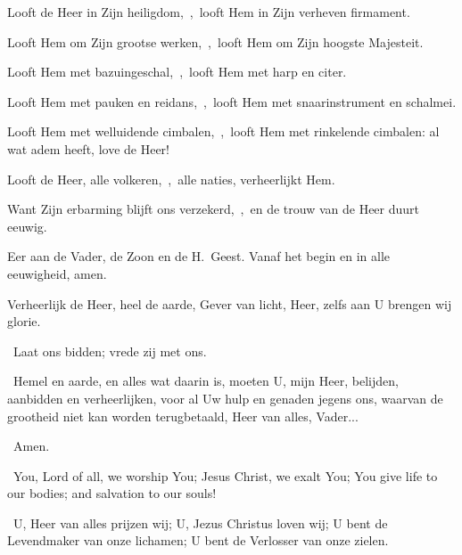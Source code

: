 \documentclass[12pt,twoside,a5paper]{article}
\begin{document}
\begin{halfparskip}
   Looft de Heer in Zijn heiligdom,~\sep\ looft Hem in Zijn verheven firmament.

  Looft Hem om Zijn grootse werken,~\sep\ looft Hem om Zijn hoogste Majesteit.

  Looft Hem met bazuingeschal,~\sep\ looft Hem met harp en citer.

  Looft Hem met pauken en reidans,~\sep\ looft Hem met snaarinstrument en schalmei.

  Looft Hem met welluidende cimbalen,~\sep\ looft Hem met rinkelende cimbalen: al wat adem heeft, love de Heer!
\end{halfparskip}

\begin{halfparskip}
   Looft de Heer, alle volkeren,~\sep\ alle naties, verheerlijkt Hem.

  Want Zijn erbarming blijft ons verzekerd,~\sep\ en de trouw van de Heer duurt eeuwig.

  Eer aan de Vader, de Zoon en de H.~Geest. Vanaf het begin en in alle eeuwigheid, amen.

  Verheerlijk de Heer, heel de aarde, Gever van licht, Heer, zelfs aan U brengen wij glorie.
\end{halfparskip}

\begin{halfparskip}
  \dd~Laat ons bidden; vrede zij met ons.

  \cc~Hemel en aarde, en alles wat daarin is, moeten U, mijn Heer, belijden, aanbidden en verheerlijken, voor al Uw hulp en genaden jegens ons, waarvan de grootheid niet kan worden terugbetaald, Heer van alles, Vader...

  \rr~Amen.
\end{halfparskip}


\CLEARPAGEAV


\vspace{\parskip}
\begin{doublecols}
  \englishl \rr~You, Lord of all, we worship You; Jesus Christ, we exalt You; You give life to our bodies; and salvation to our souls!

   \rr~U, Heer van alles prijzen wij; U, Jezus Christus loven wij; U bent de Levendmaker van onze lichamen; U bent de Verlosser van onze zielen.
\end{doublecols}
\end{document}
